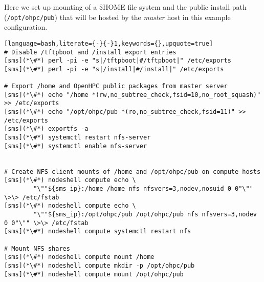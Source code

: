 Here we set up \NFS{}  mounting of a
\$HOME file system and the public \OHPC{} install path (\texttt{/opt/ohpc/pub})
that will be hosted by the {\em master} host in this  example configuration.

\vspace*{0.15cm}
\begin{lstlisting}[language=bash,literate={-}{-}1,keywords={},upquote=true]
# Disable /tftpboot and /install export entries
[sms](*\#*) perl -pi -e "s|/tftpboot|#/tftpboot|" /etc/exports
[sms](*\#*) perl -pi -e "s|/install|#/install|" /etc/exports

# Export /home and OpenHPC public packages from master server
[sms](*\#*) echo "/home *(rw,no_subtree_check,fsid=10,no_root_squash)" >> /etc/exports
[sms](*\#*) echo "/opt/ohpc/pub *(ro,no_subtree_check,fsid=11)" >> /etc/exports
[sms](*\#*) exportfs -a
[sms](*\#*) systemctl restart nfs-server
[sms](*\#*) systemctl enable nfs-server


# Create NFS client mounts of /home and /opt/ohpc/pub on compute hosts
[sms](*\#*) nodeshell compute echo \
        "\""${sms_ip}:/home /home nfs nfsvers=3,nodev,nosuid 0 0"\"" \>\> /etc/fstab
[sms](*\#*) nodeshell compute echo \
        "\""${sms_ip}:/opt/ohpc/pub /opt/ohpc/pub nfs nfsvers=3,nodev 0 0"\"" \>\> /etc/fstab
[sms](*\#*) nodeshell compute systemctl restart nfs

# Mount NFS shares
[sms](*\#*) nodeshell compute mount /home
[sms](*\#*) nodeshell compute mkdir -p /opt/ohpc/pub
[sms](*\#*) nodeshell compute mount /opt/ohpc/pub

\end{lstlisting}

